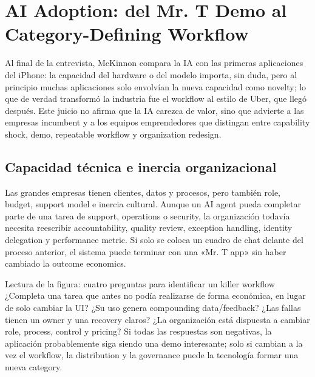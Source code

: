 \section{AI Adoption: del Mr. T Demo al Category-Defining Workflow}

Al final de la entrevista, McKinnon compara la IA con las primeras aplicaciones del iPhone: la capacidad del hardware o del modelo importa, sin duda, pero al principio muchas aplicaciones solo envolvían la nueva capacidad como novelty; lo que de verdad transformó la industria fue el workflow al estilo de Uber, que llegó después. Este juicio no afirma que la IA carezca de valor, sino que advierte a las empresas incumbent y a los equipos emprendedores que distingan entre capability shock, demo, repeatable workflow y organization redesign.

\subsection{Capacidad técnica e inercia organizacional}

Las grandes empresas tienen clientes, datos y procesos, pero también role, budget, support model e inercia cultural. Aunque un AI agent pueda completar parte de una tarea de support, operations o security, la organización todavía necesita reescribir accountability, quality review, exception handling, identity delegation y performance metric. Si solo se coloca un cuadro de chat delante del proceso anterior, el sistema puede terminar con una «Mr. T app» sin haber cambiado la outcome economics.


\begin{knowledgebox}{Lectura de la figura: cuatro preguntas para identificar un killer workflow}
¿Completa una tarea que antes no podía realizarse de forma económica, en lugar de solo cambiar la UI? ¿Su uso genera compounding data/feedback? ¿Las fallas tienen un owner y una recovery claros? ¿La organización está dispuesta a cambiar role, process, control y pricing? Si todas las respuestas son negativas, la aplicación probablemente siga siendo una demo interesante; solo si cambian a la vez el workflow, la distribution y la governance puede la tecnología formar una nueva category.
\end{knowledgebox}

